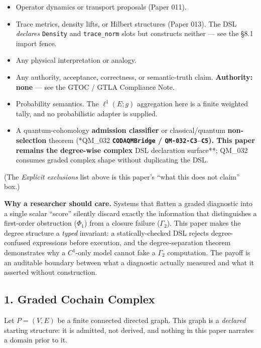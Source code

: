 \documentclass[
]{article}
\providecommand{\tightlist}{%
  \setlength{\itemsep}{0pt}\setlength{\parskip}{0pt}}
\providecommand{\tightlist}{%
  \setlength{\itemsep}{0pt}\setlength{\parskip}{0pt}}
\begin{document}
\begin{itemize}
\tightlist
\item
  Operator dynamics or transport proposals (\to Paper 011).
\item
  Trace metrics, density lifts, or Hilbert structures (\to Paper 013). The DSL \emph{declares} \texttt{Density} and \texttt{trace\_norm} slots but constructs neither --- see the §8.1 import fence.
\item
  Any physical interpretation or analogy.
\item
  Any authority, acceptance, correctness, or semantic-truth claim. \textbf{Authority: none} --- see the GTOC / GTLA Compliance Note.
\item
  Probability semantics. The \(\ell^1(E;g)\) aggregation here is a finite weighted tally, and no probabilistic adapter is supplied.
\item
  A quantum-cohomology \textbf{admission classifier} or classical/quantum \textbf{non-selection} theorem (\to **QM\_032\textbf{ \texttt{CODAQMBridge} / \texttt{QM-032-C3}--\texttt{C5}). This paper remains the degree-wise complex }DSL declaration surface**; QM\_032 consumes graded complex shape without duplicating the DSL.
\end{itemize}

(The \emph{Explicit exclusions} list above is this paper's ``what this does not claim'' box.)

\textbf{Why a researcher should care.} Systems that flatten a graded diagnostic into a single scalar ``score'' silently discard exactly the information that distinguishes a first-order obstruction (\(\Phi_1\)) from a closure failure (\(\Gamma_2\)). This paper makes the degree structure a \emph{typed} invariant: a statically-checked DSL rejects degree-confused expressions before execution, and the degree-separation theorem demonstrates why a \(C^1\)-only model cannot fake a \(\Gamma_2\) computation. The payoff is an auditable boundary between what a diagnostic actually measured and what it asserted without construction.

\subsection{1. Graded Cochain Complex}\label{graded-cochain-complex}

Let \(P = (V, E)\) be a finite connected directed graph. This graph is a \emph{declared} starting
structure: it is admitted, not derived, and nothing in this paper narrates a domain prior to it.
\end{document}
